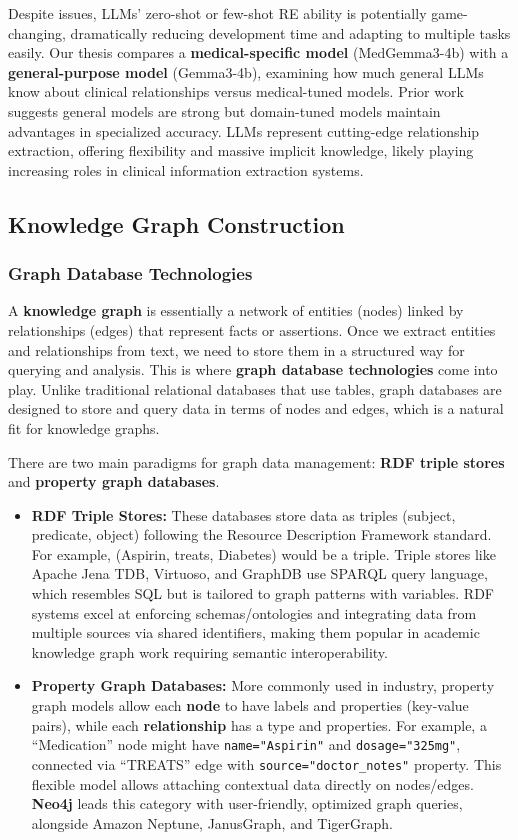Despite issues, LLMs' zero-shot or few-shot RE ability is potentially game-changing, dramatically reducing development time and adapting to multiple tasks easily. Our thesis compares a \textbf{medical-specific model} (MedGemma3-4b) with a \textbf{general-purpose model} (Gemma3-4b), examining how much general LLMs know about clinical relationships versus medical-tuned models. Prior work suggests general models are strong but domain-tuned models maintain advantages in specialized accuracy. LLMs represent cutting-edge relationship extraction, offering flexibility and massive implicit knowledge, likely playing increasing roles in clinical information extraction systems.

\subsection{Knowledge Graph Construction}

\subsubsection{Graph Database Technologies}

A \textbf{knowledge graph} is essentially a network of entities (nodes) linked by relationships (edges) that represent facts or assertions. Once we extract entities and relationships from text, we need to store them in a structured way for querying and analysis. This is where \textbf{graph database technologies} come into play. Unlike traditional relational databases that use tables, graph databases are designed to store and query data in terms of nodes and edges, which is a natural fit for knowledge graphs.

There are two main paradigms for graph data management: \textbf{RDF triple stores} and \textbf{property graph databases}.

\begin{itemize}
\item \textbf{RDF Triple Stores:} These databases store data as triples (subject, predicate, object) following the Resource Description Framework standard. For example, (Aspirin, treats, Diabetes) would be a triple. Triple stores like Apache Jena TDB, Virtuoso, and GraphDB use SPARQL query language, which resembles SQL but is tailored to graph patterns with variables. RDF systems excel at enforcing schemas/ontologies and integrating data from multiple sources via shared identifiers, making them popular in academic knowledge graph work requiring semantic interoperability.

\item \textbf{Property Graph Databases:} More commonly used in industry, property graph models allow each \textbf{node} to have labels and properties (key-value pairs), while each \textbf{relationship} has a type and properties. For example, a ``Medication'' node might have \texttt{name="Aspirin"} and \texttt{dosage="325mg"}, connected via ``TREATS'' edge with \texttt{source="doctor\_notes"} property. This flexible model allows attaching contextual data directly on nodes/edges. \textbf{Neo4j} leads this category with user-friendly, optimized graph queries, alongside Amazon Neptune, JanusGraph, and TigerGraph.
\end{itemize}

